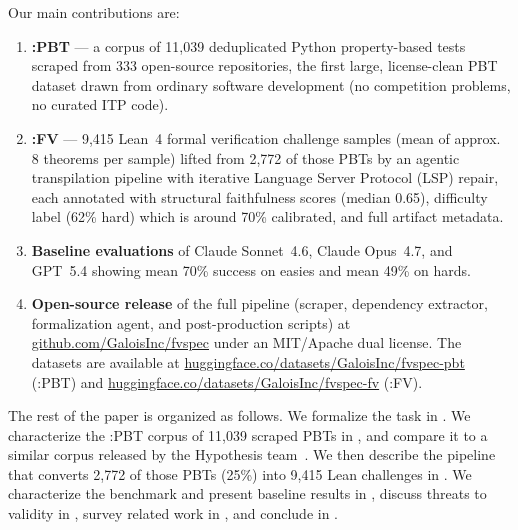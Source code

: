 Our main contributions are:
\begin{enumerate}
  \item \textbf{\FVSpec:PBT} — a corpus of 11{,}039 deduplicated Python property-based tests scraped from 333 open-source repositories, the first large, license-clean PBT dataset drawn from ordinary software development (no competition problems, no curated ITP code).
  \item \textbf{\FVSpec:FV} — 9{,}415 Lean~4 formal verification challenge samples (mean of approx. 8 theorems per sample) lifted from 2{,}772 of those PBTs by an agentic transpilation pipeline with iterative Language Server Protocol (LSP) repair, each annotated with structural faithfulness scores (median 0.65), difficulty label (62\% hard) which is around 70\% calibrated, and full artifact metadata.
  \item \textbf{Baseline evaluations} of Claude Sonnet~4.6, Claude Opus~4.7, and GPT~5.4 showing mean 70\% success on easies and mean 49\% on hards.
  \item \textbf{Open-source release} of the full pipeline (scraper, dependency extractor, formalization agent, and post-production scripts) at \href{https://github.com/GaloisInc/fvspec}{github.com/GaloisInc/fvspec} under an MIT/Apache dual license. The datasets are available at \href{https://huggingface.co/datasets/GaloisInc/fvspec-pbt}{huggingface.co/datasets/GaloisInc/fvspec-pbt} (\FVSpec:PBT) and \href{https://huggingface.co/datasets/GaloisInc/fvspec-fv}{huggingface.co/datasets/GaloisInc/fvspec-fv} (\FVSpec:FV).
\end{enumerate}



The rest of the paper is organized as follows.
We formalize the task in .
We characterize the \FVSpec:PBT corpus of 11{,}039 scraped PBTs in , and compare it to a similar corpus released by the Hypothesis team~\cite{devoe2026hypothesis}.
We then describe the pipeline that converts 2{,}772 of those PBTs (25\%) into 9{,}415 Lean challenges in .
We characterize the benchmark and present baseline results in , discuss threats to validity in , survey related work in , and conclude in .